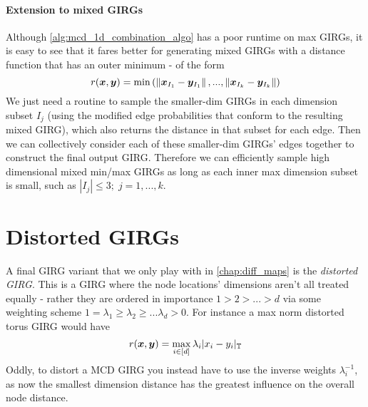 

\paragraph{Extension to mixed GIRGs}
Although \cref{alg:mcd_1d_combination_algo} has a poor runtime on max GIRGs, it is easy to see that it fares better for generating mixed GIRGs with a distance function that has an outer minimum - of the form 
\begin{equation}
    r(\bm{x}, \bm{y}) = \min \left ( \left\lVert \bm{x}_{I_1} - \bm{y}_{I_1}\right\rVert, ..., \left\lVert \bm{x}_{I_k} - \bm{y}_{I_k}\right\rVert  \right )
\end{equation}
We just need a routine to sample the smaller-dim GIRGs in each dimension subset $I_j$ (using the modified edge probabilities that conform to the resulting mixed GIRG), which also returns the distance in that subset for each edge. Then we can collectively consider each of these smaller-dim GIRGs' edges together to construct the final output GIRG.
Therefore we can efficiently sample high dimensional mixed min/max GIRGs as long as each inner max dimension subset is small, such as $|I_j| \leq 3;\; j=1,...,k$.



\section{Distorted GIRGs}
\label{subsec:distorted_girgs}
A final GIRG variant that we only play with in \cref{chap:diff_maps} is the \textit{distorted GIRG}. This is a GIRG where the node locations' dimensions aren't all treated equally - rather they are ordered in importance $1 > 2 > ... > d$ via some weighting scheme $1=\lambda_1 \geq \lambda_2 \geq ... \lambda_d > 0$. For instance a max norm distorted torus GIRG would have
\begin{equation}
    r(\bm{x}, \bm{y}) = \max\limits_{i \in [d]} \lambda_i |x_i - y_i|_{\mathbb{T}}
\end{equation}
Oddly, to distort a MCD GIRG you instead have to use the inverse weights $\lambda_i^{-1}$, as now the smallest dimension distance has the greatest influence on the overall node distance.

